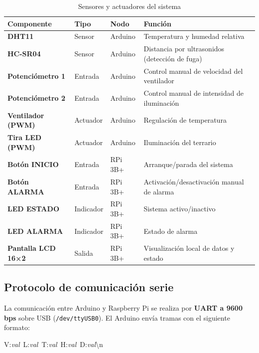 \documentclass[12pt, a4paper]{article}
\begin{document}
\begin{table}[H]
    \centering
    \caption{Sensores y actuadores del sistema}
    \label{tab:componentes}
    \renewcommand{\arraystretch}{1.3}
    \begin{tabularx}{\textwidth}{>{\bfseries}l l l X}
        \toprule
        Componente          & Tipo      & Nodo    & Función \\
        \midrule
        DHT11               & Sensor    & Arduino & Temperatura y humedad relativa \\
        HC-SR04             & Sensor    & Arduino & Distancia por ultrasonidos (detección de fuga) \\
        Potenciómetro 1     & Entrada   & Arduino & Control manual de velocidad del ventilador \\
        Potenciómetro 2     & Entrada   & Arduino & Control manual de intensidad de iluminación \\
        Ventilador (PWM)    & Actuador  & Arduino & Regulación de temperatura \\
        Tira LED (PWM)      & Actuador  & Arduino & Iluminación del terrario \\
        Botón INICIO        & Entrada   & RPi 3B+ & Arranque/parada del sistema \\
        Botón ALARMA        & Entrada   & RPi 3B+ & Activación/desactivación manual de alarma \\
        LED ESTADO          & Indicador & RPi 3B+ & Sistema activo/inactivo \\
        LED ALARMA          & Indicador & RPi 3B+ & Estado de alarma \\
        Pantalla LCD 16×2   & Salida    & RPi 3B+ & Visualización local de datos y estado \\
        \bottomrule
    \end{tabularx}
\end{table}

\subsection{Protocolo de comunicación serie}

La comunicación entre Arduino y Raspberry Pi se realiza por \textbf{UART a 9600 bps}
sobre USB (\texttt{/dev/ttyUSB0}). El Arduino envía tramas con el siguiente formato:

\begin{center}
\ttfamily V:\textit{val}\ L:\textit{val}\ T:\textit{val}\ H:\textit{val}\ D:\textit{val}\textbackslash{}n
\end{center}
\end{document}
